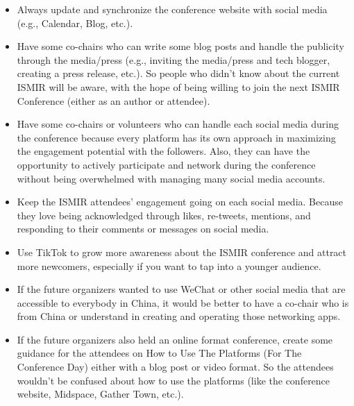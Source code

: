 \documentclass[%
10pt,								%
titlepage,						%
]
{scrartcl}
\def\showTodos{true}
\begin{document}
        \begin{itemize}
            \item   Always update and synchronize the conference website with social media (e.g., Calendar, Blog, etc.).
            \item   Have some co-chairs who can write some blog posts and handle the publicity through the media/press (e.g., inviting the media/press and tech blogger, creating a press release, etc.). So people who didn't know about the current ISMIR will be aware, with the hope of being willing to join the next ISMIR Conference (either as an author or attendee).
            \item   Have some co-chairs or volunteers who can handle each social media during the conference because every platform has its own approach in maximizing the engagement potential with the followers. Also, they can have the opportunity to actively participate and network during the conference without being overwhelmed with managing many social media accounts.
            \item   Keep the ISMIR attendees' engagement going on each social media. Because they love being acknowledged through likes, re-tweets, mentions, and responding to their comments or messages on social media.
            \item   Use TikTok to grow more awareness about the ISMIR conference and attract more newcomers, especially if you want to tap into a younger audience.
            \item   If the future organizers wanted to use WeChat or other social media that are accessible to everybody in China, it would be better to have a co-chair who is from China or understand in creating and operating those networking apps.
            \item   If the future organizers also held an online format conference, create some guidance for the attendees on How to Use The Platforms (For The Conference Day) either with a blog post or video format. So the attendees wouldn't be confused about how to use the platforms (like the conference website, Midspace, Gather Town, etc.).

        \end{itemize}

\ifthenelse{\equal{\showTodos}{true}}{
\textcolor{red}{
\section{Website}
    TODO: add content
}}{} 
\end{document}
